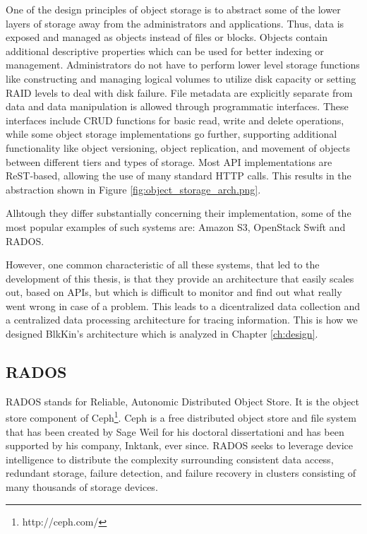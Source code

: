 One of the design principles of object storage is to abstract some of the lower
layers of storage away from the administrators and applications. Thus, data is
exposed and managed as objects instead of files or blocks. Objects contain
additional descriptive properties which can be used for better indexing or
management. Administrators do not have to perform lower level storage functions
like constructing and managing logical volumes to utilize disk capacity or
setting RAID levels to deal with disk failure. File metadata are explicitly
separate from data and data manipulation is allowed through programmatic
interfaces. These interfaces include CRUD functions for basic read, write and
delete operations, while some object storage implementations go further,
supporting additional functionality like object versioning, object replication,
and movement of objects between different tiers and types of storage. Most API
implementations are ReST-based, allowing the use of many standard HTTP calls.
This results in the abstraction shown in Figure
\ref{fig:object_storage_arch.png}.
 

Alhtough they differ substantially concerning their implementation, some of the
most popular examples of such systems are: Amazon S3, OpenStack Swift and RADOS.

However, one common characteristic of all these systems, that led to the
development of this thesis, is that they provide an architecture that easily
scales out, based on APIs, but which is difficult to monitor and find out what
really went wrong in case of a problem. This leads to a dicentralized data
collection and a centralized data processing architecture for tracing
information. This is how we designed BlkKin's architecture which is analyzed in
Chapter \ref{ch:design}.

\subsection{RADOS}\label{sec:rados}
RADOS stands for  Reliable, Autonomic Distributed Object Store. It is the object
store component of Ceph\footnote{http://ceph.com/}. Ceph is a free distributed
object store and file system that has been created by Sage Weil for his doctoral
dissertationi\cite{weil-thesis} and has been supported by his company, Inktank,
ever since.  RADOS seeks to leverage device intelligence to distribute the
complexity surrounding consistent data access, redundant storage, failure
detection, and failure recovery in clusters consisting of many thousands of
storage devices.

